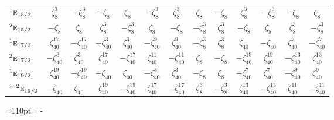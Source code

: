 \documentclass[10pt,a4paper]{article}
\newcommand{\needspace}[1]{\par\penalty-100\begingroup\dimen0=#1\relax\dimen2=\pagegoal
  \advance\dimen2-\pagetotal\ifdim\dimen0>\dimen2\relax\ifdim\dimen2>0pt\vfil\break\fi\fi
  \endgroup}
\numberwithin{equation}{section}
\newcommand{\irr}[1]{\text{\normalfont\scshape #1}}
\newcommand{\conjpair}[1]{{}^{#1}}
\newcommand{\rootunity}[1]{\zeta_{#1}}
\begin{document}
{\begin{longtable}{@{}lcccccccccccc@{}}
$\conjpair{1}\irr{e}_{15/2}$ & $\rootunity{8}^{3}$ & $-\rootunity{8}^{3}$ & $-\rootunity{8}$ & $\rootunity{8}$ & $-\rootunity{8}^{3}$ & $\rootunity{8}^{3}$ & $\rootunity{8}$ & $-\rootunity{8}$ & $\rootunity{8}^{3}$ & $-\rootunity{8}^{3}$ & $-\rootunity{8}$ & $\rootunity{8}$\\
$\conjpair{2}\irr{e}_{15/2}$ & $-\rootunity{8}$ & $\rootunity{8}$ & $\rootunity{8}^{3}$ & $-\rootunity{8}^{3}$ & $\rootunity{8}$ & $-\rootunity{8}$ & $-\rootunity{8}^{3}$ & $\rootunity{8}^{3}$ & $-\rootunity{8}$ & $\rootunity{8}$ & $\rootunity{8}^{3}$ & $-\rootunity{8}^{3}$\\
$\conjpair{1}\irr{e}_{17/2}$ & $\rootunity{40}^{17}$ & $-\rootunity{40}^{17}$ & $-\rootunity{40}^{3}$ & $\rootunity{40}^{3}$ & $-\rootunity{40}^{9}$ & $\rootunity{40}^{9}$ & $-\rootunity{8}^{3}$ & $\rootunity{8}^{3}$ & $\rootunity{40}$ & $-\rootunity{40}$ & $\rootunity{40}^{7}$ & $-\rootunity{40}^{7}$\\
$\conjpair{2}\irr{e}_{17/2}$ & $-\rootunity{40}^{3}$ & $\rootunity{40}^{3}$ & $\rootunity{40}^{17}$ & $-\rootunity{40}^{17}$ & $\rootunity{40}^{11}$ & $-\rootunity{40}^{11}$ & $\rootunity{8}$ & $-\rootunity{8}$ & $-\rootunity{40}^{19}$ & $\rootunity{40}^{19}$ & $-\rootunity{40}^{13}$ & $\rootunity{40}^{13}$\\
$\conjpair{1}\irr{e}_{19/2}$ & $\rootunity{40}^{19}$ & $-\rootunity{40}^{19}$ & $-\rootunity{40}$ & $\rootunity{40}$ & $-\rootunity{40}^{3}$ & $\rootunity{40}^{3}$ & $-\rootunity{8}$ & $\rootunity{8}$ & $-\rootunity{40}^{7}$ & $\rootunity{40}^{7}$ & $-\rootunity{40}^{9}$ & $\rootunity{40}^{9}$\\*
$\conjpair{2}\irr{e}_{19/2}$ & $-\rootunity{40}$ & $\rootunity{40}$ & $\rootunity{40}^{19}$ & $-\rootunity{40}^{19}$ & $\rootunity{40}^{17}$ & $-\rootunity{40}^{17}$ & $\rootunity{8}^{3}$ & $-\rootunity{8}^{3}$ & $\rootunity{40}^{13}$ & $-\rootunity{40}^{13}$ & $\rootunity{40}^{11}$ & $-\rootunity{40}^{11}$\\
\bottomrule\end{longtable}}
\needspace{110pt}
\end{document}
